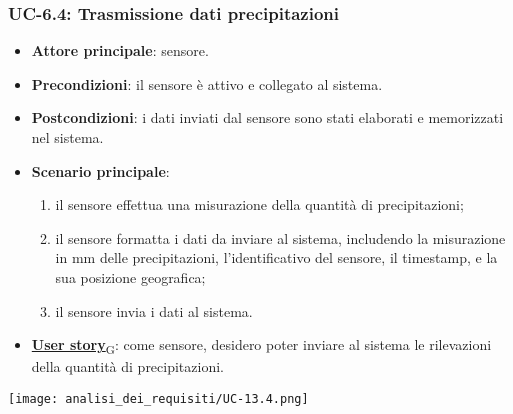 \subsubsection{UC-6.4: Trasmissione dati precipitazioni}
\begin{itemize}
	\item \textbf{Attore principale}: sensore.
	\item \textbf{Precondizioni}: il sensore è attivo e collegato al sistema.
	\item \textbf{Postcondizioni}: i dati inviati dal sensore sono stati elaborati e memorizzati nel sistema.
	\item \textbf{Scenario principale}:
	      \begin{enumerate}
		      \item il sensore effettua una misurazione della quantità di precipitazioni;
		      \item il sensore formatta i dati da inviare al sistema, includendo la misurazione in mm delle precipitazioni, l'identificativo del sensore,
		            il timestamp, e la sua posizione geografica;
		      \item il sensore invia i dati al sistema.
	      \end{enumerate}
	\item \href{https://7last.github.io/docs/pb/documentazione-interna/glossario\#user-story}{\textbf{User story}\textsubscript{G}}: come sensore, desidero poter inviare al sistema le rilevazioni della quantità di precipitazioni.
\end{itemize}

\begin{center}
	\texttt{[image: analisi\_dei\_requisiti/UC-13.4.png]}
\end{center}
